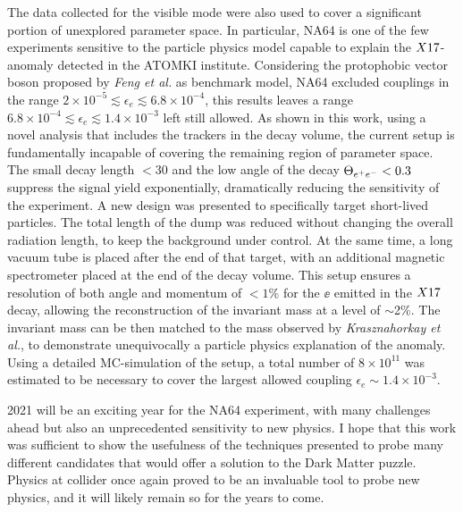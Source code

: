 The data collected for the visible mode were also used to cover a significant portion of unexplored parameter space. In particular, NA64 is one of the few experiments sensitive to the particle physics model capable to explain the $X17$-anomaly detected in the ATOMKI institute. Considering the protophobic vector boson proposed by \textit{Feng et al.}\cite{Feng:2016jff} as benchmark model, NA64 excluded couplings in the range $2 \times 10^{-5} \lesssim \epsilon_e \lesssim 6.8 \times 10^{-4}$, this results leaves a range $6.8 \times 10^{-4} \lesssim \epsilon_e \lesssim 1.4 \times 10^{-3}$ left still allowed. As shown in this work, using a novel analysis that includes the trackers in the decay volume, the current setup is fundamentally incapable of covering the remaining region of parameter space. The small decay length $<$30 \mmi and the low angle of the decay $\Theta_{ e^+e^-} < 0.3$ \mrad suppress the signal yield exponentially, dramatically reducing the sensitivity of the experiment. A new design was presented to specifically target short-lived particles. The total length of the dump was reduced without changing the overall radiation length, to keep the background under control. At the same time, a long vacuum tube is placed after the end of that target, with an additional magnetic spectrometer placed at the end of the decay volume. This setup ensures a resolution of both angle and momentum of $<1\%$ for the $\ee$ emitted in the $X17$ decay, allowing the reconstruction of the invariant mass at a level of $\sim$2\%. The invariant mass can be then matched to the mass observed by \textit{Krasznahorkay et al.}, to demonstrate unequivocally a particle physics explanation of the anomaly. Using a detailed MC-simulation of the setup, a total number of $8 \times 10^{11}$ was estimated to be necessary to cover the largest allowed coupling $\epsilon_e \sim 1.4 \times 10^{-3}$.

2021 will be an exciting year for the NA64 experiment, with many challenges ahead but also an unprecedented sensitivity to new physics. I hope that this work was sufficient to show the usefulness of the techniques presented to probe many different candidates that would offer a solution to the Dark Matter puzzle. Physics at collider once again proved to be an invaluable tool to probe new physics, and it will likely remain so for the years to come.


